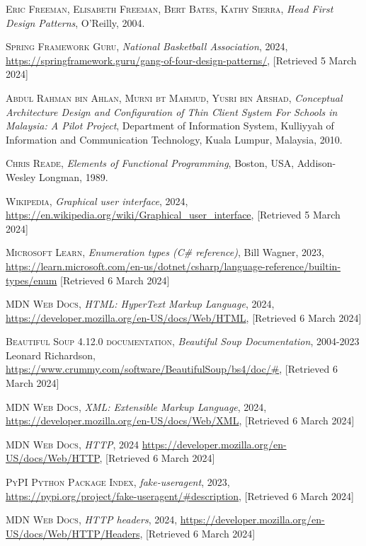 \documentclass{thesis-ekf}
\theoremstyle{definition}
\theoremstyle{remark}
\begin{document}
\begin{thebibliography}{2}
\textsc{Eric Freeman, Elisabeth Freeman, Bert Bates, Kathy Sierra},
\emph{Head First Design Patterns},
O'Reilly, 2004.

\textsc{Spring Framework Guru},
\emph{National Basketball Association}, 2024, 
\url{https://springframework.guru/gang-of-four-design-patterns/}, [Retrieved 5 March 2024]

\textsc{Abdul Rahman bin Ahlan, Murni bt Mahmud, Yusri bin Arshad},
\emph{Conceptual Architecture Design and Configuration of Thin Client System For Schools in Malaysia: A Pilot Project}, 
Department of Information System, Kulliyyah of Information and Communication Technology,
Kuala Lumpur, Malaysia, 2010.

\textsc{Chris Reade},
\emph{Elements of Functional Programming}, 
Boston, USA, Addison-Wesley Longman, 1989.

\textsc{Wikipedia},
\emph{Graphical user interface}, 2024,
\url{https://en.wikipedia.org/wiki/Graphical_user_interface}, [Retrieved 5 March 2024]

\textsc{Microsoft Learn},
\emph{Enumeration types (C\# reference)}, Bill Wagner, 2023,
\url{https://learn.microsoft.com/en-us/dotnet/csharp/language-reference/builtin-types/enum} [Retrieved 6 March 2024]

\textsc{MDN Web Docs},
\emph{HTML: HyperText Markup Language}, 2024,
\url{https://developer.mozilla.org/en-US/docs/Web/HTML}, [Retrieved 6 March 2024]

\textsc{Beautiful Soup 4.12.0 documentation}, 
\emph{Beautiful Soup Documentation}, 2004-2023 Leonard Richardson,
\url{https://www.crummy.com/software/BeautifulSoup/bs4/doc/#}, [Retrieved 6 March 2024]

\textsc{MDN Web Docs}, 
\emph{XML: Extensible Markup Language}, 2024,
\url{https://developer.mozilla.org/en-US/docs/Web/XML}, [Retrieved 6 March 2024]

\textsc{MDN Web Docs}, 
\emph{HTTP}, 2024
\url{https://developer.mozilla.org/en-US/docs/Web/HTTP}, [Retrieved 6 March 2024]

\textsc{PyPI Python Package Index},
\emph{fake-useragent}, 2023,
\url{https://pypi.org/project/fake-useragent/#description}, [Retrieved 6 March 2024]

\textsc{MDN Web Docs}, 
\emph{HTTP headers}, 2024,
\url{https://developer.mozilla.org/en-US/docs/Web/HTTP/Headers}, [Retrieved 6 March 2024]


\end{thebibliography}
\end{document}
